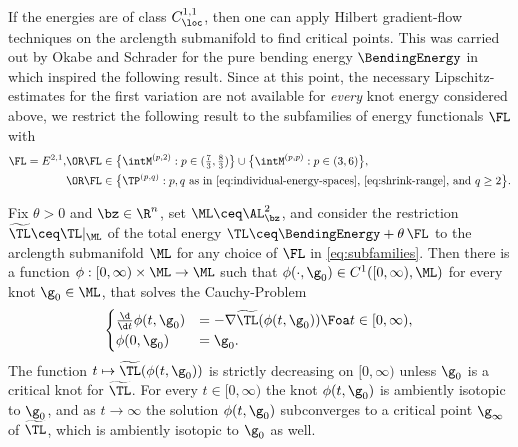 If the energies are of class $C^{1,1}_\loc$, then one can apply
Hilbert gradient-flow techniques on the arclength submanifold
to find critical points. This was carried out by Okabe and Schrader for
the pure bending energy $\BendingEnergy$ in \cite{okabe-schrader_2023}
 which inspired the following result.
Since at this point,  the necessary 
Lipschitz-estimates for the first
variation are not available
for \emph{every} knot energy considered above,
we restrict the following result
to the subfamilies of energy functionals $\FL$ with 
\begin{align}\label{eq:subfamilies}
\FL=E^{2,1},&\OR 
\textstyle
\FL\in 
\big\{\intM^{(p,2)} : p\in (\frac{7}{3} , \frac{8}{3}) \big\}
\cup
\big\{\intM^{(p,p)} : p\in (3,6)\big\},
\notag\\
&\OR\FL\in\big\{\TP^{(p,q)} : \textnormal{$p,q$ as in \cref{eq:individual-energy-spaces},
\cref{eq:shrink-range}, and $q\ge 2$}\big\}. 
\end{align}
\begin{theorem}
\label{thm:gradient-flow-total-energy}
        Fix $\theta >0$ and $\bz\in\R^n$, set $\ML\ceq\AL^2_\bz$,
        and consider the restriction
        $\widetilde{\TL}\ceq\TL|_{\ML}$ of the total energy
        $\TL \ceq \BendingEnergy + \theta \, \FL$ to the arclength submanifold $\ML$
        for any choice of $\FL$ in \cref{eq:subfamilies}.
        Then there is a function $\phi:[0,\infty)\times\ML\to\ML$ such
        that $\phi(\cdot,\g_0)\in C^1([0,\infty),\ML)$ for every knot
        $\g_0\in\ML$, that solves the Cauchy-Problem 
        \begin{equation}
                \label{eq:gradient-flow-total-energy}
                \begin{cases}
                        \frac{\d}{\d t}\phi(t,\g_0)& =-\nabla
                        \widetilde{\TL}(\phi(t,
                        \g_0))   
                                \Foa t\in [0,\infty),\\
                        \phi(0,\g_0)&=\g_0.  
                \end{cases}
        \end{equation}
        The function $t\mapsto\widetilde{\TL}(\phi(t,\g_0))$ 
        is strictly decreasing on $[0,\infty)$ unless
        $\g_0$ is 
        a critical knot for $\widetilde{\TL}$.
        For every $t\in [0,\infty)$ the knot $\phi(t,\g_0)$ is ambiently isotopic to $\g_0$, and as
        $t\to\infty$ the solution $\phi(t,\g_0)$ subconverges
        to a critical point $\g_\infty$ of  
        $\widetilde{\TL}$, which is ambiently isotopic
        to $\g_0$ as well. 
\end{theorem}  

